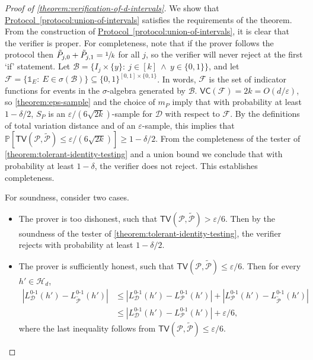 \documentclass[11pt]{article}
\numberwithin{equation}{section}
\theoremstyle{definition}
\theoremstyle{plain}
\newcommand{\expref}[2]{\hyperref[#2]{#1~\ref{#2}}}
\theoremstyle{definition}\newtheorem{notation}[theorem]{Notation}\theoremstyle{plain}\raggedbottom
\newcommand{\roundBrackets}[1]{
	\mathopen{}\left(#1\right)\mathclose{}
}
\newcommand{\squareBrackets}[1]{
	\mathopen{}\left[#1\right]\mathclose{}
}
\newcommand{\customFunctionRound}[2]{
	#1\roundBrackets{#2}
}
\newcommand{\customFunctionSquare}[2]{
	#1\squareBrackets{#2}
}
\newcommand{\sfFunction}[2]{
	\customFunctionRound{\mathsf{#1}}{#2}
}
\newcommand{\bbFunction}[2]{
	\customFunctionSquare{\mathbb{#1}}{#2}
}
\newcommand{\BigO}[1]{O\roundBrackets{#1}}
\newcommand{\PP}[1]{\bbFunction{P}{#1}}
\newcommand{\LossIndicator}[2]{\LossIndicatorNameEmpty_{#1}\roundBrackets{#2}}
\newcommand{\LossIndicatorNameEmpty}{L^{0\text{-}1}}
\newcommand{\TV}[1]{\sfFunction{TV}{#1}}
\newcommand{\VC}[1]{\sfFunction{VC}{#1}}
\newcommand{\cB}{\mathcal{B}}
\newcommand{\cD}{\mathcal{D}}
\newcommand{\cF}{\mathcal{F}}
\newcommand{\cH}{\mathcal{H}}
\newcommand{\cP}{\mathcal{P}}
\newcommand{\1}{\mathds{1}}
\newcommand{\mP}{m_{\scriptscriptstyle P}}
\begin{document}
\begin{proof}[Proof of \cref{theorem:verification-of-d-intervals}]
We show that \expref{Protocol}{protocol:union-of-intervals} %
	satisfies the requirements of the theorem. From the construction of \expref{Protocol}{protocol:union-of-intervals}, it is clear that the verifier is proper. For completeness, note that if the prover follows the protocol then $\tilde{P}_{j,0} + \tilde{P}_{j,1} = \sfrac{1}{k}$ for all $j$, so the verifier will never reject at the first `if' statement. Let $\cB = \{I_j \times \{y\}: ~ j \in [k] ~ \land ~ y \in \{0,1\}\}$, and let $\cF = \{\1_E: ~ E \in \sigma(\cB)\} \subseteq \{0,1\}^{[0,1]\times \{0,1\}}$. In words, $\cF$ is the set of indicator functions for events in the $\sigma$-algebra generated by $\cB$. $\VC{\cF} = 2k = \BigO{d/\varepsilon}$, so \cref{theorem:eps-sample} and the choice of $\mP$ imply that with probability at least $1-\delta/2$, $S_P$ is an $\varepsilon/(6\sqrt{2k})$-sample for $\cD$ with respect to $\cF$. By the definitions of total variation distance and of an $\varepsilon$-sample, this implies that $\PP{\TV{\cP,\tilde{\cP}} \leq \varepsilon/(6\sqrt{2k})} \geq 1-\delta/2$. From the completeness of the tester of \cref{theorem:tolerant-identity-testing} and a union bound we conclude that with probability at least $1-\delta$, the verifier does not reject. This establishes completeness.

	For soundness, consider two cases. 
	\begin{itemize}
		\item{
			The prover is too dishonest, such that $\TV{\cP,\tilde{\cP}} > \varepsilon/6$. Then by the soundness of the tester of \cref{theorem:tolerant-identity-testing}, the verifier rejects with probability at least $1-\delta/2$.
		} 
		\item{
			The prover is sufficiently honest, such that $\TV{\cP,\tilde{\cP}} \leq \varepsilon/6$. 
			Then for every $h' \in \cH_d$,
			\begin{align}
				\left|\LossIndicator{\cD}{h'} - \LossIndicator{\tilde{\cP}}{h'}\right| &\leq \left|\LossIndicator{\cD}{h'} - \LossIndicator{\cP}{h'}\right| + \left|\LossIndicator{\cP}{h'} - \LossIndicator{\tilde{\cP}}{h'}\right|  \nonumber\\
				&\leq \left|\LossIndicator{\cD}{h'} - \LossIndicator{\cP}{h'}\right| + \varepsilon/6, \label{eq:LD-vs-LPtilde}
			\end{align}
			where the last inequality follows from $\TV{\cP,\tilde{\cP}} \leq \varepsilon/6$.
		
}
\end{itemize}
\end{proof}
\end{document}
